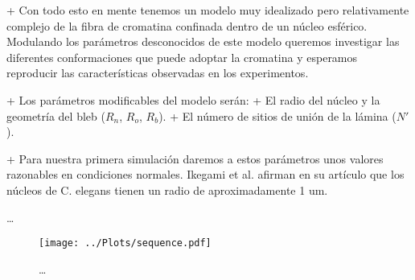 + Con todo esto en mente tenemos un modelo muy idealizado pero relativamente complejo de la fibra de cromatina confinada dentro de un núcleo esférico. Modulando los parámetros desconocidos de este modelo queremos investigar las diferentes conformaciones que puede adoptar la cromatina y esperamos reproducir las características observadas en los experimentos.

+ Los parámetros modificables del modelo serán:
+ El radio del núcleo y la geometría del bleb ($R_n$, $R_o$, $R_b$).
+ El número de sitios de unión de la lámina ($N'$).

+ Para nuestra primera simulación daremos a estos parámetros unos valores razonables en condiciones normales. Ikegami et al. afirman en su artículo que los núcleos de C. elegans tienen un radio de aproximadamente 1 $\text{um}$.

\cite{Ho2014}\dots

\begin{figure}
    \centering
    \texttt{[image: ../Plots/sequence.pdf]}
    \caption{\dots}
    \label{fig:sequence}
\end{figure}

